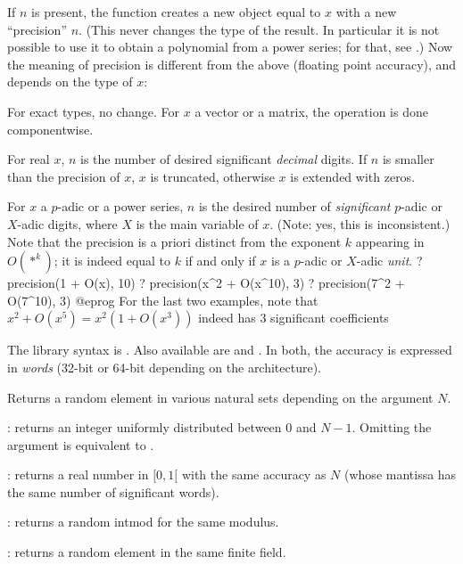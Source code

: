 If $n$ is present, the function creates a new object equal to $x$ with a new
``precision'' $n$. (This never changes the type of the result. In particular
it is not possible to use it to obtain a polynomial from a power series; for
that, see .) Now the meaning of precision is different from the
above (floating point accuracy), and depends on the type of $x$:

For exact types, no change. For $x$ a vector or a matrix, the operation is
done componentwise.

For real $x$, $n$ is the number of desired significant \emph{decimal}
digits. If $n$ is smaller than the precision of $x$, $x$ is truncated,
otherwise $x$ is extended with zeros.

For $x$ a $p$-adic or a power series, $n$ is the desired number of
\emph{significant} $p$-adic or $X$-adic digits, where $X$ is the main
variable of $x$. (Note: yes, this is inconsistent.)
Note that the precision is a priori distinct from the exponent $k$ appearing
in $O(*^k)$; it is indeed equal to $k$ if and only if $x$ is a $p$-adic
or $X$-adic \emph{unit}.
\bprog
? precision(1 + O(x), 10)
? precision(x^2 + O(x^10), 3)
? precision(7^2 + O(7^10), 3)
@eprog\noindent
For the last two examples, note that $x^2 + O(x^5) = x^2(1 + O(x^3))$
indeed has 3 significant coefficients

The library syntax is .
Also available are  and
. In both, the accuracy is expressed in
\emph{words} (32-bit or 64-bit depending on the architecture).

\label{se:random}
Returns a random element in various natural sets depending on the
argument $N$.

\item {}: returns an integer
uniformly distributed between $0$ and $N-1$. Omitting the argument
is equivalent to .

\item {}: returns a real number in $[0,1[$ with the same accuracy as
$N$ (whose mantissa has the same number of significant words).

\item {}: returns a random intmod for the same modulus.

\item {}: returns a random element in the same finite field.

